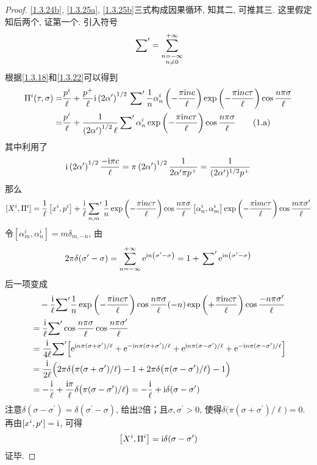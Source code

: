 \begin{proof}
    \eqref{1.3.24b}, \eqref{1.3.25a}, \eqref{1.3.25b}三式构成因果循环, 知其二, 可推其三. 这里假定知后两个, 证第一个. 引入符号
\[\sideset{}{'}\sum={\sum_{\substack{n=-\infty \\  n \neq 0}}^{+\infty} }\]
根据\eqref{1.3.18}和\eqref{1.3.22}可以得到
\begin{align}
\Pi^{i}(\tau, \sigma)
=&\frac{p^{i}}{\ell}+\frac{p^+}{\ell}\mathrm{i} \left(2 \alpha^{\prime}\right)^{1 / 2} \sideset{}{'}\sum \frac{1}{n} \alpha_{n}^{i}\left(-\frac{\pi \mathrm{i} n c}{\ell}\right) \exp \left(-\frac{\pi \mathrm{i} n c \tau}{\ell}\right) \cos \frac{n \pi \sigma}{\ell} \nonumber \\
=&\frac{p^ i}{\ell}+\frac{1}{\left(2 \alpha^{\prime}\right)^{1 / 2} \ell} \sideset{}{'}\sum \alpha_{n}^{i} \exp \left(-\frac{\pi \mathrm{i} n c\tau}{\ell}\right) \cos \frac{n \pi \sigma}{\ell} \tag{1.a} \label{1.a}
\end{align}
其中利用了
\[
\mathrm{i}\left(2 \alpha^{\prime }\right)^{1 / 2} \frac{-\mathrm{i} \pi c}{\ell}=\pi\left(2 \alpha^{\prime}\right)^{1 / 2} \frac{1}{2 \alpha^{\prime} \pi p^{+}}=\frac{1}{(2 \alpha^\prime)^{1 / 2} p^{+}}
\]
那么
\[
[X^{i} , \Pi^{i}]=\frac{1}{\ell}\left[x^{i} , p^{i}\right]+\frac{\mathrm{i}}{\ell } \sideset{}{'}\sum_{n,m} \frac{1}{n} \exp \left(-\frac{\pi \mathrm{i} n c \tau}{\ell}\right) \cos \frac{n \pi \sigma}{\ell}
\left[\alpha_{n}^{i}, \alpha_{m}^{i}\right] \exp \left(-\frac{\pi \mathrm{i} m c \tau}{\ell}\right) \cos \frac{m \pi\sigma^\prime}{\ell}
\]
令$\left[\alpha_{m}^{i}, \alpha_{n}^{i}\right]=m \delta_{m,-n}$, 由
\[
2\pi\delta(\sigma^{\prime}-\sigma)=\sum_{n=-\infty}^{+\infty} \mathrm{e}^{ \mathrm{i} n\left(\sigma^{\prime}-\sigma\right)}
=1+\sideset{}{'}\sum \mathrm{e}^{ \mathrm{i} n \left(\sigma^{\prime}-\sigma\right)}
\]
后一项变成
\begin{align*}
&\quad -\frac{\mathrm{i}}{\ell} {\sum}^\prime \frac{1}{n} \exp \left(-\frac{\pi \mathrm{i} n c \tau}{\ell}\right) \cos \frac{n \pi \sigma}{\ell}(-n)  \exp \left(+\frac{\pi \mathrm{i} n c \tau}{\ell}\right) \cos \frac{-n \pi \sigma^\prime}{\ell}\\
&=\frac{\mathrm{i}}{\ell} {\sum}^\prime \cos\frac{n \pi \sigma}{\ell} \cos \frac{n \pi \sigma^{\prime}}{\ell} \\
&=\frac{\mathrm{i}}{ 4\ell}  {\sum}^\prime \Bigl[\mathrm{e}^{\mathrm{i} n \pi(\sigma+\sigma^{\prime})/\ell}+\mathrm{e}^{-\mathrm{i} n \pi(\sigma+\sigma^{\prime})/\ell}+ \mathrm{e}^{\mathrm{i} n \pi(\sigma-\sigma^{\prime})/\ell}+\mathrm{e}^{-\mathrm{i} n \pi(\sigma-\sigma^{\prime})/\ell}\Bigr]\\
&=\frac{\mathrm{i}}{2\ell} \Bigl( 2\pi\delta\bigl(\pi(\sigma+\sigma^{\prime})/\ell\bigr)-1+2\pi\delta\bigl(\pi(\sigma-\sigma^{\prime})/\ell\bigr)-1 \Bigr) \\
&=-\frac{\mathrm{i}}{\ell}+\frac{\mathrm{i} \pi}{ \ell} \delta\bigl(\pi(\sigma-\sigma^{\prime})/\ell\bigr) 
=-\frac{\mathrm{i}}{\ell}+\mathrm{i} \delta(\sigma-\sigma^{\prime})
\end{align*}
注意$\delta(\sigma-\sigma^\prime)=\delta(\sigma^\prime-\sigma)$, 给出2倍；且$\sigma,\sigma^\prime>0$, 使得$\delta\bigl(\pi(\sigma+\sigma^{\prime})/\ell\bigr)=0$. 再由$[x^{i}, p^{i}]=\mathrm{i}$, 可得
$$\left[X^{i} , \Pi^{i}\right]=\mathrm{i} \delta(\sigma-\sigma^{\prime})$$ 
证毕. 
\end{proof}
